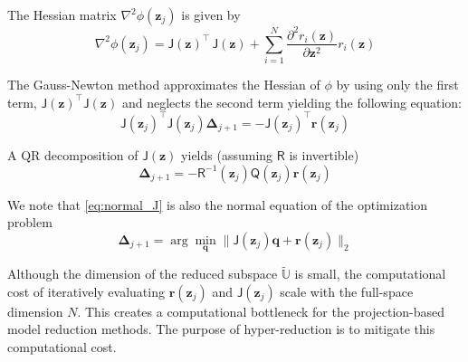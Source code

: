 \documentclass[11pt]{article}
\renewcommand{\vec}[1]{\mathbf{#1}}
\newcommand{\mat}[1]{\mathsf{#1}}
\begin{document}
The Hessian matrix $\nabla^2\phi(\vec{z}_j)$ is given by
\begin{equation}
\nabla^2\phi(\vec{z}_j) = \mat{J}(\vec{z})^{\top}\,\mat{J}(\vec{z})+ \sum_{i=1}^{N} \frac{\partial^2 r_i(\mathbf{z})}{\partial \mathbf{z}^2} r_i(\mathbf{z})
\label{eq:Gauss_newton_step}
\end{equation}


The Gauss-Newton method approximates the Hessian of $\phi$ by using only the first term, $\mat{J}(\vec{z})^{\top} \mat{J}(\vec{z})$ and neglects the second term yielding the following equation:
\begin{equation}
\mat{J}(\mathbf{z}_{j})^{\top} \mat{J}(\mathbf{z}_{j}) \boldsymbol{\Delta}_{j+1} = -\mat{J}(\mathbf{z}_{j})^{\top} \mathbf{r}(\mathbf{z}_{j})
\label{eq:normal_J}
\end{equation}

A QR decomposition of $\mat{J}(\vec{z})$ yields (assuming $\mat{R}$ is invertible)
\begin{equation}
\boldsymbol{\Delta}_{j+1} = - \mat{R}^{-1}(\vec{z}_j)\mat{Q}(\vec{z}_j)\mathbf{r}(\mathbf{z}_{j})
\label{eq:normal_J2}
\end{equation}


We note that \cref{eq:normal_J} is also the normal equation of the  optimization problem
\begin{equation}
    \boldsymbol{\Delta}_{j+1} = \arg\min_{\vec{q}}\| \mat{J}(\vec{z}_j)\vec{q} + \vec{r}(\vec{z}_j)  \|_2
    \label{eq:normal_optimization}
\end{equation}


Although the dimension of the reduced subspace $\widetilde{\mathbb{U}}$ is small, the computational cost of iteratively evaluating $\vec{r}(\vec{z}_j)$ and $\mat{J}(\vec{z}_j)$ scale with the full-space dimension $N$.
This creates a computational bottleneck for the projection-based model reduction methods.
The purpose of hyper-reduction is to mitigate this computational cost.
\end{document}
